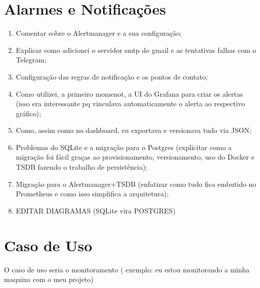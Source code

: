 {\section{Alarmes e Notificações}
\label{section:AlarmesNotificacoes
}
\begin{enumerate}
  \item Comentar sobre o Alertmanager e a sua configuração;
  \item Explicar como adicionei o servidor smtp do gmail e as tentativas falhas com o Telegram;
  \item Configuração das regras de notificação e os pontos de contato;
  \item Como utilizei, a primeiro momenot, a UI do Grafana para criar os alertas (isso era interessante pq vinculava automaticamente o alerta ao respectivo gráfico);
  \item Como, assim como no dashboard, eu exportava e versionava tudo via JSON;
  \item Problemas do SQLite e a migração para o Postgres (explicitar como a migração foi fácil graças ao provisionamento, versionamento, uso do Docker e TSDB fazendo o trabalho de persistência);
  \item Migração para o Alertmanager+TSDB (enfatizar como tudo fica embutido no Prometheus e como isso simplifica a arquitetura);
  \item EDITAR DIAGRAMAS (SQLite vira POSTGRES)
\end{enumerate}


}


\section{Caso de Uso}
\label{section:CasosDeUso}

O caso de uso seria o monitoramento ( exemplo: eu estou monitorando a minha maquina com o meu projeto)

